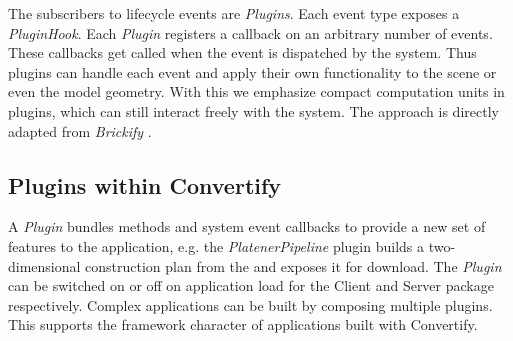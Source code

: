 \documentclass[../ClassicThesis.tex]{subfiles}
\begin{document}
The subscribers to lifecycle events are \emph{Plugins}. Each event
type exposes a \emph{PluginHook}. Each \emph{Plugin} registers a
callback on an arbitrary number of events. These callbacks get
called when the event is dispatched by the system. Thus plugins can
handle each event and apply their own functionality to the scene or
even the model geometry. With this we emphasize compact computation
units in plugins, which can still interact freely with the system.
The approach is directly adapted from \emph{Brickify} .


\subsection{Plugins within Convertify}

A \emph{Plugin} bundles methods and system event callbacks to
provide a new set of features to the application, e.g. the
\emph{PlatenerPipeline} plugin builds a two-dimensional construction
plan from the {\threedmodel} and exposes it for download. The
\emph{Plugin} can be switched on or off on application load for the
Client and Server package respectively. Complex applications can be
built by composing multiple plugins. This supports the framework
character of applications built with Convertify.




\end{document}
